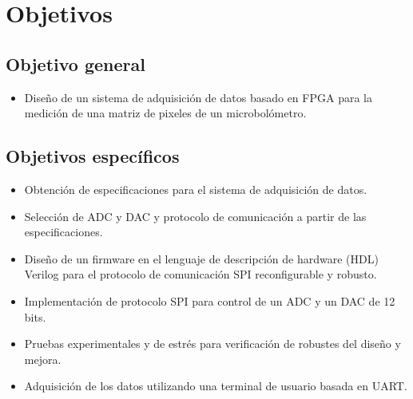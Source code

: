 		
    \section{Objetivos}
	
		\subsection{Objetivo general}
			\begin{itemize}
				\item Diseño de un sistema de adquisición de datos basado en FPGA para la medición de una matriz de pixeles de un microbolómetro.
			\end{itemize}
		
		\subsection{Objetivos específicos}
			\begin{itemize}
                \item Obtención de especificaciones para el sistema de adquisición de datos.
                \item Selección de ADC y DAC y protocolo de comunicación a partir de las especificaciones.
                \item Diseño de un firmware en el lenguaje de descripción de hardware (HDL) Verilog para el protocolo de comunicación SPI reconfigurable y robusto.
                \item Implementación de protocolo SPI para control de un ADC y un DAC de 12 bits.
                \item Pruebas experimentales y de estrés para verificación de robustes del diseño y mejora.
                \item Adquisición de los datos utilizando una terminal de usuario basada en UART.
			\end{itemize}
